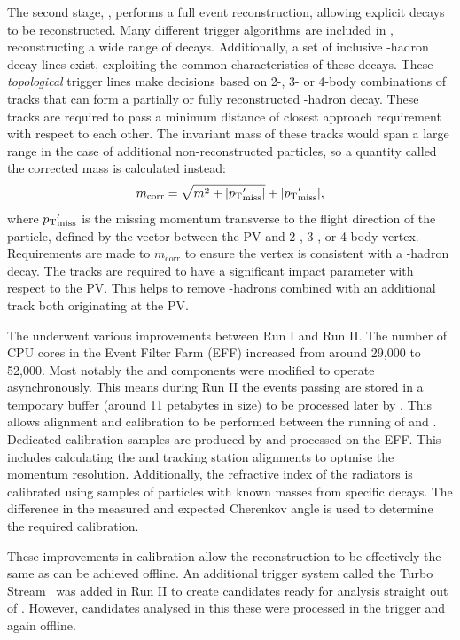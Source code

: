 The second stage, \hlttwo, performs a full event reconstruction, allowing explicit decays to be reconstructed. Many different trigger algorithms are included in \hlttwo, reconstructing a wide range of decays. Additionally, a set of inclusive \bquark-hadron decay lines exist, exploiting the common characteristics of these decays. These \emph{topological} trigger lines make decisions based on 2-, 3- or 4-body combinations of tracks that can form a partially or fully reconstructed \bquark-hadron decay. These tracks are required to pass a minimum distance of closest approach requirement with respect to each other. The invariant mass of these tracks would span a large range in the case of additional non-reconstructed particles, so a quantity called the corrected mass is calculated instead:
\begin{equation}
m_{\text{corr}} = \sqrt{m^{2} + |\mbox{$p_{\mathrm{ T}}$}'_{\text{miss}}|} + |\mbox{$p_{\mathrm{ T}}$}'_{\text{miss}}|,
\end{equation}   
where $\mbox{$p_{\mathrm{ T}}$}'_{\text{miss}}$ is the missing momentum transverse to the flight direction of the particle, defined by the vector between the PV and 2-, 3-, or 4-body vertex. Requirements are made to $m_{\text{corr}}$ to ensure the vertex is consistent with a \bquark-hadron decay.
The tracks are required to have a significant impact parameter with respect to the PV. This helps to remove \cquark-hadrons combined with an additional track both originating at the PV.



The \hlt underwent various improvements between Run I and Run II. The number of CPU cores in the Event Filter Farm (EFF) increased from around 29,000 to 52,000. Most notably the \hltone and \hlttwo components were modified to operate asynchronously. This means during Run II the events passing \hltone are stored in a temporary buffer (around 11 petabytes in size) to be processed later by \hlttwo. This allows alignment and calibration to be performed between the running of \hltone and \hlttwo. Dedicated calibration samples are produced by \hltone and processed on the EFF. This includes calculating the \velo and tracking station alignments to optmise the momentum resolution. Additionally, the refractive index of the \rich radiators is calibrated using samples of particles with known masses from specific decays. The difference in the measured and expected Cherenkov angle is used to determine the required calibration. 

These improvements in calibration allow the \hlttwo reconstruction to be effectively the same as can be achieved offline. An additional trigger system called the Turbo Stream~\cite{1742-6596-664-8-082004} was added in Run II to create candidates ready for analysis straight out of \hlttwo. However, candidates analysed in this these were processed in the trigger and again offline.


